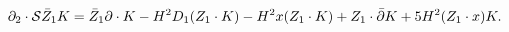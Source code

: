 \begin{equation}
\partial_2 \cdot {\cal S}\bar Z_1K=\bar Z_1
\partial \cdot K-H^2D_1(Z_{1}\cdot K)-H^2x(Z_{1}\cdot
K)+Z_{1}\cdot\bar\partial K+5H^2(Z_{1}\cdot x)
K.\label{eq:divergenceless}
\end{equation}

